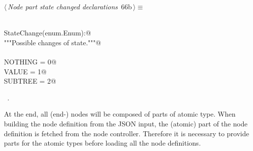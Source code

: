 \documentclass[
    a4paper,      %
    10pt,         %
    openright,    %
    notitlepage,  %
    parskip=half, %
]{scrreprt}       %
\theoremstyle{definition}                    %
\begin{document}
\begin{flushleft} \small
\begin{minipage}{\linewidth}\label{scrap109}\raggedright\small
{} $\langle\,${\itshape Node part state changed declarations}\nobreak\ {\footnotesize {66b}}$\,\rangle\equiv$
\vspace{-1exm}
\begin{list}{}{} \item
\mbox{}\lstinline@@\\
\mbox{}\lstinline@class StateChange(enum.Enum):@\\
\mbox{}\lstinline@    """Possible changes of state."""@\\
\mbox{}\lstinline@@\\
\mbox{}\lstinline@    NOTHING  = 0@\\
\mbox{}\lstinline@    VALUE    = 1@\\
\mbox{}\lstinline@    SUBTREE  = 2@{\NWsep}
\end{list}
\vspace{-1.5ex}
\footnotesize
\begin{list}{}{\setlength{\itemsep}{-\parsep}\setlength{\itemindent}{-\leftmargin}}
\item \NWtxtMacroRefIn\ .

\item{}
\end{list}
\end{minipage}\vspace{4ex}
\end{flushleft}
At the end, all (end-) nodes will be composed of parts of atomic type.
When building the node definition from the JSON input, the (atomic) part of the
node definition is fetched from the node controller. Therefore it is necessary
to provide parts for the atomic types before loading all the node definitions.
\end{document}
